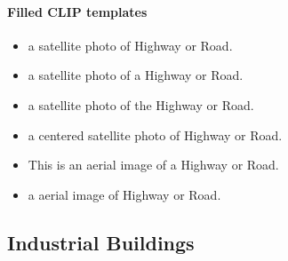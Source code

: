 \documentclass[11pt]{article}
\begin{document}
\paragraph{Filled CLIP templates}\begin{itemize}
\item a satellite photo of Highway or Road.
\item a satellite photo of a Highway or Road.
\item a satellite photo of the Highway or Road.
\item a centered satellite photo of Highway or Road.
\item This is an aerial image of a Highway or Road.
\item a aerial image of Highway or Road.
\end{itemize}
\subsection{Industrial Buildings}
\end{document}
